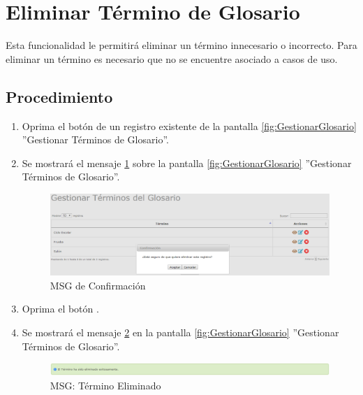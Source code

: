\hypertarget{cv:eliminarTermino}{\section{Eliminar Término de Glosario}} \label{sec:eliminarTermino}

	Esta funcionalidad le permitirá eliminar un término innecesario o incorrecto. Para eliminar un término es necesario que no se encuentre asociado a casos de uso.

		\subsection{Procedimiento}

			\begin{enumerate}
	
			\item Oprima el botón \IUBotonEliminar{} de un registro existente de la pantalla \ref{fig:GestionarGlosario} ''Gestionar Términos de Glosario''.
	
			\item Se mostrará el mensaje \ref{fig:confirmaEliminaTermino} sobre la pantalla \ref{fig:GestionarGlosario} ''Gestionar Términos de Glosario''.
			
			\begin{figure}[htbp!]
				\begin{center}
					\includegraphics[scale=0.5]{roles/lider/glosario/pantallas/IU6-3MSG10}
					\caption{MSG de Confirmación}
					\label{fig:confirmaEliminaTermino}
				\end{center}
			\end{figure}
						
			\item Oprima el botón \IUAceptar.
			
			\item Se mostrará el mensaje \ref{fig:terminoEliminado} en la pantalla \ref{fig:GestionarGlosario} ''Gestionar Términos de Glosario''.
			
			\begin{figure}[htbp!]
				\begin{center}
					\includegraphics[scale=0.5]{roles/lider/glosario/pantallas/IU6-3MSG1}
					\caption{MSG: Término Eliminado}
					\label{fig:terminoEliminado}
				\end{center}
			\end{figure}
			\end{enumerate}